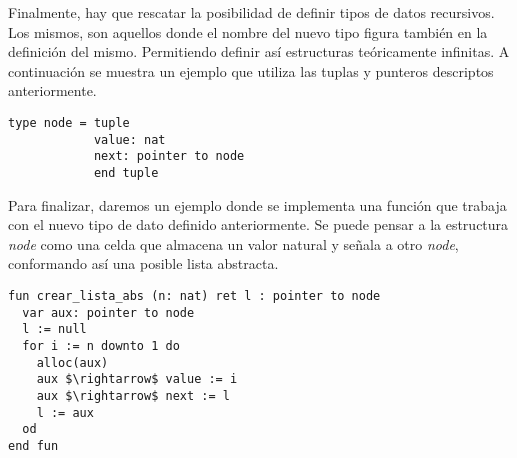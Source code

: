 \documentclass{article}
\begin{document}
Finalmente, hay que rescatar la posibilidad de definir tipos de datos recursivos.
Los mismos, son aquellos donde el nombre del nuevo tipo figura también en la definición del mismo.
Permitiendo definir así estructuras teóricamente infinitas.
A continuación se muestra un ejemplo que utiliza las tuplas y punteros descriptos anteriormente.

\begin{lstlisting}
type node = tuple
            value: nat
            next: pointer to node
            end tuple
\end{lstlisting}

Para finalizar, daremos un ejemplo donde se implementa una función que trabaja con el nuevo tipo de dato definido anteriormente.
Se puede pensar a la estructura \textit{node} como una celda que almacena un valor natural y señala a otro \textit{node}, conformando así una posible lista abstracta.

\begin{lstlisting}
fun crear_lista_abs (n: nat) ret l : pointer to node
  var aux: pointer to node
  l := null
  for i := n downto 1 do
    alloc(aux)
    aux $\rightarrow$ value := i
    aux $\rightarrow$ next := l
    l := aux
  od
end fun
\end{lstlisting}
\end{document}

